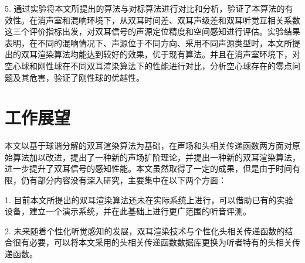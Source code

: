 5. 通过实验将本文所提出的算法与对标算法进行对比和分析，验证了本算法的有效性。在消声室和混响环境下，从双耳时间差、双耳声级差和双耳听觉互相关系数这三个评价指标出发，对双耳信号的声源定位精度和空间感知进行评估。实验结果表明，在不同的混响情况下、声源位于不同方向、采用不同声源类型时，本文所提出的双耳渲染算法均能达到较好的效果，优于现有算法。并且在消声室环境下，对空心球和刚性球在不同双耳渲染算法下的性能进行对比，分析空心球存在的零点问题及其危害，验证了刚性球的优越性。


\section{工作展望}

本文以基于球谐分解的双耳渲染算法为基础，在声场和头相关传递函数两方面对原始算法加以改进，提出了一种新的声场扩阶理论，并提出一种新的双耳渲染算法，进一步提升了双耳信号的感知性能。本文虽然取得了一定的成果，但是由于时间有限，仍有部分内容没有深入研究，主要集中在以下两个方面：

1. 目前本文所提出的双耳渲染算法还未在实际系统上进行，可以借助已有的实验设备，建立一个演示系统，并在此基础上进行更广范围的听音评测。

2. 未来随着个性化听觉感知的发展，双耳渲染技术与个性化头相关传递函数的结合很有必要，可以将本文采用的头相关传递函数数据库更换为听者特有的头相关传递函数。
